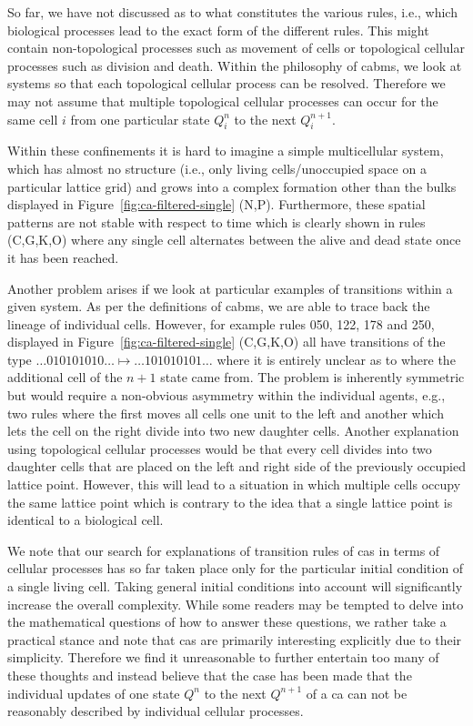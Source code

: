 So far, we have not discussed as to what constitutes the various rules, i.e., which biological
processes lead to the exact form of the different rules.
This might contain non-topological processes such as movement of cells or topological cellular
processes such as division and death.
Within the philosophy of \acp{cabm}, we look at systems so that each topological cellular process
can be resolved.
Therefore we may not assume that multiple topological cellular processes can occur for the same
cell $i$ from one particular state $Q^n_i$ to the next $Q^{n+1}_i$.

Within these confinements it is hard to imagine a simple multicellular system, which has almost no
structure (i.e., only living cells/unoccupied space on a particular lattice grid) and grows into a
complex formation other than the bulks displayed in Figure~\ref{fig:ca-filtered-single} (N,P).
Furthermore, these spatial patterns are not stable with respect to time which is clearly shown in
rules (C,G,K,O) where any single cell alternates between the alive and dead state once it has been
reached.

Another problem arises if we look at particular examples of transitions within a given system.
As per the definitions of \acp{cabm}, we are able to trace back the lineage of individual cells.
However, for example rules 050, 122, 178 and 250, displayed in Figure~\ref{fig:ca-filtered-single}
(C,G,K,O) all have transitions of the type $\dots010101010\dots\mapsto\dots101010101\dots$ where it
is entirely unclear as to where the additional cell of the $n+1$ state came from.
The problem is inherently symmetric but would require a non-obvious asymmetry within the individual
agents, e.g., two rules where the first moves all cells one unit to the left and another which lets
the cell on the right divide into two new daughter cells.
Another explanation using topological cellular processes would be that every cell divides into two
daughter cells that are placed on the left and right side of the previously occupied lattice point.
However, this will lead to a situation in which multiple cells occupy the same lattice point which
is contrary to the idea that a single lattice point is identical to a biological cell.

We note that our search for explanations of transition rules of \acp{ca} in terms of cellular
processes has so far taken place only for the particular initial condition of a single living cell.
Taking general initial conditions into account will significantly increase the overall complexity.
While some readers may be tempted to delve into the mathematical questions of how to answer these
questions, we rather take a practical stance and note that \acp{ca} are primarily interesting
explicitly due to their simplicity.
Therefore we find it unreasonable to further entertain too many of these thoughts and instead
believe that the case has been made that the individual updates of one state $Q^n$ to the next
$Q^{n+1}$ of a \ac{ca} can not be reasonably described by individual cellular processes.

